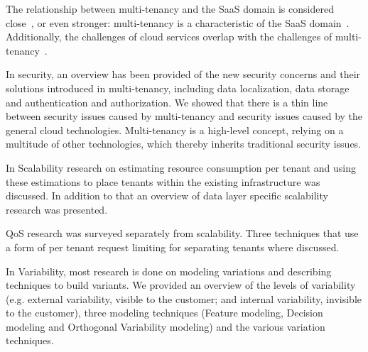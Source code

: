 \documentclass{article}
\begin{document}
The relationship between multi-tenancy and the \ac{SaaS} domain is considered close~\cite{dillon2010cloud}, or even stronger: multi-tenancy is a characteristic of the \ac{SaaS} domain~\cite{tsai2010towards}. Additionally, the challenges of cloud services overlap with the challenges of multi-tenancy~\cite{dillon2010cloud,krebs2012architecture}.

In security, an overview has been provided of the new security concerns and their solutions introduced in multi-tenancy, including data localization, data storage and authentication and authorization. We showed that there is a thin line between security issues caused by multi-tenancy and security issues caused by the general cloud technologies. Multi-tenancy is a high-level concept, relying on a multitude of other technologies, which thereby inherits traditional security issues.  

In Scalability research on estimating resource consumption per tenant and using these estimations to place tenants within the existing infrastructure was discussed. In addition to that an overview of data layer specific scalability research was presented.

\ac{QoS} research was surveyed separately from scalability. Three techniques that use a form of per tenant request limiting for separating tenants where discussed.

In Variability, most research is done on modeling variations and describing techniques to build variants. We provided an overview of the levels of variability (e.g. external variability, visible to the customer; and internal variability, invisible to the customer), three modeling techniques (Feature modeling, Decision modeling and Orthogonal Variability modeling) and the various variation techniques.
\end{document}
